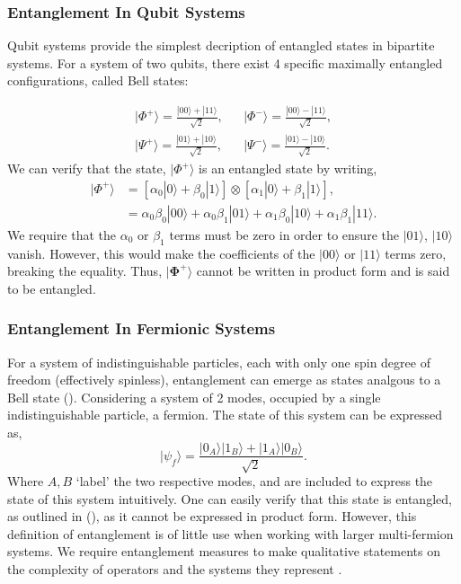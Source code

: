 \subsubsection{Entanglement In Qubit Systems}
Qubit systems provide the simplest decription of entangled states in bipartite systems. For a system of two qubits, there exist 4 specific maximally entangled configurations, called Bell states: 

\begin{align}\label{bellpair}
    |\Phi^{+}\rangle = \frac{|00\rangle + |11\rangle }{\sqrt{2}}, && |\Phi^{-}\rangle = \frac{|00\rangle - |11\rangle }{\sqrt{2}},
    \\
    |\Psi^{+}\rangle = \frac{|01\rangle + |10\rangle }{\sqrt{2}}, && |\Psi^{-}\rangle = \frac{|01\rangle - |10\rangle }{\sqrt{2}}.
\end{align}
We can verify that the state, $|\Phi^{+}\rangle $ is an entangled state by writing, 
\begin{align}\label{entangle}
    |{\Phi}^+\rangle &=  \left[ \alpha_0 |0\rangle + \beta_0|1\rangle\right] \otimes \left[\alpha_1 |0\rangle + \beta_1|1\rangle\right], \\
    &=                      \alpha_0\beta_0 |00\rangle + \alpha_0\beta_1|01\rangle + \alpha_1\beta_0|10\rangle + \alpha_1\beta_1|11\rangle.
\end{align}
We require that the $\alpha_0$ or $\beta_1$ terms must be zero in order to ensure the $|01\rangle$, $|10\rangle$ vanish. However, this would make the coefficients of the $|00\rangle$ or $|11\rangle$ terms zero, breaking the equality. Thus, $|{\bm\Phi}^+\rangle$ cannot be written in product form and is said to be entangled.

\subsubsection{Entanglement In Fermionic Systems}

For a system of indistinguishable particles, each with only one spin degree of freedom (effectively spinless), entanglement can emerge as states analgous to a Bell state (). Considering a system of 2 modes, occupied by a single indistinguishable particle, a fermion. The state of this system can be expressed as, 
\begin{equation}
    |\psi_{f}\rangle = \frac{|0_{A}\rangle |{1_{B}}\rangle + |1_{A}\rangle |0_{B}\rangle}{\sqrt{2}}.
\end{equation}
Where $A, B$ `label' the two respective modes, and are included to express the state of this system intuitively.
One can easily verify that this state is entangled, as outlined in (), as it cannot be expressed in product form.  However, this definition of entanglement is of little use when working with larger multi-fermion systems. We require entanglement measures to make qualitative statements on the complexity of operators and the systems they represent \cite{Eckert_2002}.


